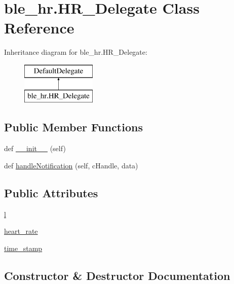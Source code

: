 \hypertarget{classble__hr_1_1HR__Delegate}{}\section{ble\+\_\+hr.\+H\+R\+\_\+\+Delegate Class Reference}
\label{classble__hr_1_1HR__Delegate}
Inheritance diagram for ble\+\_\+hr.\+H\+R\+\_\+\+Delegate\+:\begin{figure}[H]
\begin{center}
\leavevmode
\includegraphics[height=2.000000cm]{classble__hr_1_1HR__Delegate}
\end{center}
\end{figure}
\subsection*{Public Member Functions}
\begin{DoxyCompactItemize}
\item 
def \hyperlink{classble__hr_1_1HR__Delegate_a50888fdeec27db99c92d8fcf1bf661e7}{\+\_\+\+\_\+init\+\_\+\+\_\+} (self)
\item 
def \hyperlink{classble__hr_1_1HR__Delegate_a373ab424d0357665265754d1a54ce093}{handle\+Notification} (self, c\+Handle, data)
\end{DoxyCompactItemize}
\subsection*{Public Attributes}
\begin{DoxyCompactItemize}
\item 
\hyperlink{classble__hr_1_1HR__Delegate_ad442fb90fb3f92ca843ee0c925e680e4}{l}
\item 
\hyperlink{classble__hr_1_1HR__Delegate_a54dcf43e7f403635aa14aba00626858e}{heart\+\_\+rate}
\item 
\hyperlink{classble__hr_1_1HR__Delegate_abf244fc6909adeb05d6d1e0cb549f357}{time\+\_\+stamp}
\end{DoxyCompactItemize}


\subsection{Constructor \& Destructor Documentation}
\mbox{\label{classble__hr_1_1HR__Delegate_a50888fdeec27db99c92d8fcf1bf661e7}} 

